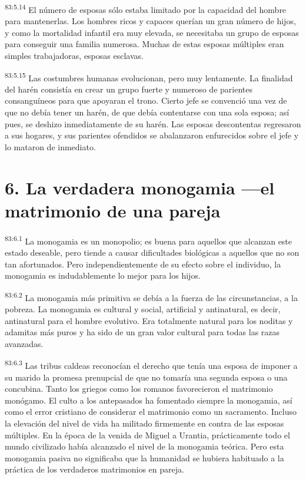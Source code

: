 \documentclass[twoside, 11pt]{book}
\begin{document}
\par
\textsuperscript{83:5.14} El número de esposas sólo estaba limitado por la capacidad del hombre para mantenerlas. Los hombres ricos y capaces querían un gran número de hijos, y como la mortalidad infantil era muy elevada, se necesitaba un grupo de esposas para conseguir una familia numerosa. Muchas de estas esposas múltiples eran simples trabajadoras, esposas esclavas.

\par
\textsuperscript{83:5.15} Las costumbres humanas evolucionan, pero muy lentamente. La finalidad del harén consistía en crear un grupo fuerte y numeroso de parientes consanguíneos para que apoyaran el trono. Cierto jefe se convenció una vez de que no debía tener un harén, de que debía contentarse con una sola esposa; así pues, se deshizo inmediatamente de su harén. Las esposas descontentas regresaron a sus hogares, y sus parientes ofendidos se abalanzaron enfurecidos sobre el jefe y lo mataron de inmediato.

\section*{6. La verdadera monogamia ---el matrimonio de una pareja}
\par
\textsuperscript{83:6.1} La monogamia es un monopolio; es buena para aquellos que alcanzan este estado deseable, pero tiende a causar dificultades biológicas a aquellos que no son tan afortunados. Pero independientemente de su efecto sobre el individuo, la monogamia es indudablemente lo mejor para los hijos.

\par
\textsuperscript{83:6.2} La monogamia más primitiva se debía a la fuerza de las circunstancias, a la pobreza. La monogamia es cultural y social, artificial y antinatural, es decir, antinatural para el hombre evolutivo. Era totalmente natural para los noditas y adamitas más puros y ha sido de un gran valor cultural para todas las razas avanzadas.

\par
\textsuperscript{83:6.3} Las tribus caldeas reconocían el derecho que tenía una esposa de imponer a su marido la promesa prenupcial de que no tomaría una segunda esposa o una concubina. Tanto los griegos como los romanos favorecieron el matrimonio monógamo. El culto a los antepasados ha fomentado siempre la monogamia, así como el error cristiano de considerar el matrimonio como un sacramento. Incluso la elevación del nivel de vida ha militado firmemente en contra de las esposas múltiples. En la época de la venida de Miguel a Urantia, prácticamente todo el mundo civilizado había alcanzado el nivel de la monogamia teórica. Pero esta monogamia pasiva no significaba que la humanidad se hubiera habituado a la práctica de los verdaderos matrimonios en pareja.
\end{document}
